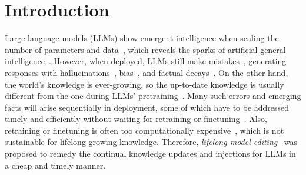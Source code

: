 \documentclass{article}
\begin{document}
\section{Introduction}\label{sec:intro}
Large language models (LLMs) show emergent intelligence when scaling the number of parameters and data~\cite{scaling_law,scaling_law_data_pruning,revisiting_scaling_law,DBLP:journals/corr/abs-2303-18223}, which reveals the sparks of artificial general intelligence~\cite{gpt4_agi_sparks}. However, when deployed, LLMs still make mistakes~\cite{llm_factual_error}, generating responses with hallucinations~\cite{hallucination_survey}, bias~\cite{chatgpt_bias}, and factual decays~\cite{llm_factual_delay}. 
On the other hand, the world's knowledge is ever-growing, so the up-to-date knowledge is usually different from the one during LLMs' pretraining~\cite{grace}. Many such errors and emerging facts will arise sequentially in deployment, some of which have to be addressed timely and efficiently without waiting for retraining or finetuning~\cite{t-patcher,llm_temperal_generalization_gap}. 
Also, retraining or finetuning is often too computationally expensive~\cite{llama-2,grace}, which is not sustainable for lifelong growing knowledge. 
Therefore, \emph{lifelong model editing}~\cite{grace} was proposed to remedy the continual knowledge updates and injections for LLMs in a cheap and timely manner. 
\end{document}
